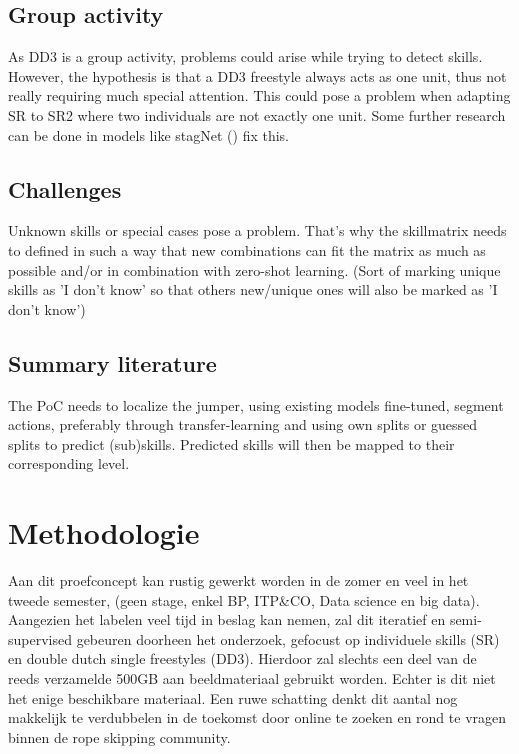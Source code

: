 \subsection{Group activity}

As DD3 is a group activity, problems could arise while trying to detect skills. However, the hypothesis is that a DD3 freestyle always acts as one unit, thus not really requiring much special attention. This could pose a problem when adapting SR to SR2 where two individuals are not exactly one unit. Some further research can be done in models like stagNet (\autocite{stagnet-volleybal}) fix this.

\subsection{Challenges}
\label{subsec:challenges}

Unknown skills or special cases pose a problem. That's why the skillmatrix needs to defined in such a way that new combinations can fit the matrix as much as possible and/or in combination with zero-shot learning. (Sort of marking unique skills as 'I don't know' so that others new/unique ones will also be marked as 'I don't know')


\subsection{Summary literature}
\label{subsec:summary literature}

The PoC needs to localize the jumper, using existing models fine-tuned, segment actions, preferably through transfer-learning and using own splits or guessed splits to predict (sub)skills.
Predicted skills will then be mapped to their corresponding level.



\section{Methodologie}%
\label{sec:methodologie}

Aan dit proefconcept kan rustig gewerkt worden in de zomer en veel in het tweede semester, (geen stage, enkel BP, ITP\&CO, Data science en big data). Aangezien het labelen veel tijd in beslag kan nemen, zal dit iteratief en semi-supervised gebeuren doorheen het onderzoek, gefocust op individuele skills (SR) en double dutch single freestyles (DD3). Hierdoor zal slechts een deel van de reeds verzamelde 500GB aan beeldmateriaal gebruikt worden. Echter is dit niet het enige beschikbare materiaal. Een ruwe schatting denkt dit aantal nog makkelijk te verdubbelen in de toekomst door online te zoeken en rond te vragen binnen de rope skipping community.
    
